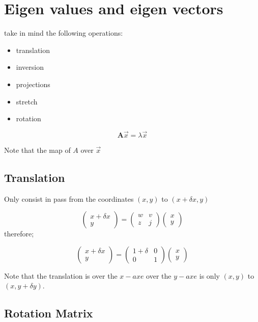 \documentclass[10pt,a4paper]{article}
\begin{document}
\section{Eigen values and eigen vectors}

take in mind the following operations:
\begin{itemize}
\item translation
\item inversion
\item projections
\item stretch 
\item rotation
\end{itemize}


\begin{equation}
\textbf{A}\vec{x}  = \lambda \vec{x}
\end{equation}

Note that the map of $A$ over $\vec{x}$ 




\subsection{Translation}
Only consist in pass from the coordinates $(x,y)$ to 
$(x+\delta x, y)$ 

\[
\begin{pmatrix}
x + \delta x \\
y 
\end{pmatrix}
=
\begin{pmatrix}
w & v \\
z & j
\end{pmatrix}
\begin{pmatrix}
x\\
y
\end{pmatrix}
\]
therefore; 


\[
\begin{pmatrix}
x + \delta x \\
y 
\end{pmatrix}
=
\begin{pmatrix}
1 + \delta & 0 \\
0 & 1
\end{pmatrix}
\begin{pmatrix}
x\\
y
\end{pmatrix}
\]

Note that the translation is over the $x-axe$ over the $y-axe$ is only $(x,y)$ to $(x,y + \delta y ).$
\subsection{Rotation Matrix}
\end{document}
